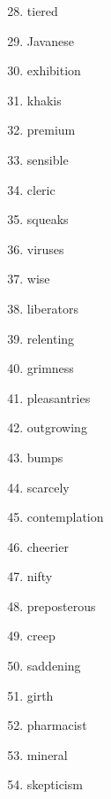 \documentclass{article}
\begin{document}
  \parbox{0.3\linewidth}{
    \begin{enumerate}
      \setcounter{enumi}{27}
      \item tiered
      \item Javanese
      \item exhibition
      \item khakis
      \item premium
      \item sensible
      \item cleric
      \item squeaks
      \item viruses
      \item wise
      \item liberators
      \item relenting
      \item grimness
      \item pleasantries
      \item outgrowing
      \item bumps
      \item scarcely
      \item contemplation
      \item cheerier
      \item nifty
      \item preposterous
      \item creep
      \item saddening
      \item girth
      \item pharmacist
      \item mineral
      \item skepticism
    \end{enumerate}
  }
\end{document}
